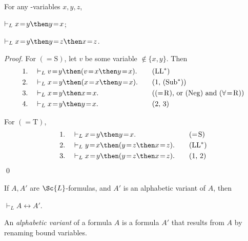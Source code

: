 \documentclass[11pt]{woarticle}
\theoremstyle{break}
\theoremstyle{nonumberplain}
\newcommand{\1}{\;\,|\;\,}
\newcommand{\T}[1]{\ensuremath{(\mathrm{ #1})}}
\newcommand{\itemT}[1]{\item[\T{#1}]}
\begin{document}
\begin{lemma}\label{symtrans}
  For any -variables $x,y,z$,
  \begin{semantics}
    \itemT{=\!S} $\vdash_L x\!=\!y \then y\!=\!x$;
    \itemT{=\!T} $\vdash_L x\!=\!y \then y\!=\!z \then x\!=\!z$.
  \end{semantics}
\end{lemma}  

\begin{proof}
  For \T{=S}, let $v$ be some variable $\not\in \{x,y\}$. Then
  \begin{alignat*}{2}
    1.\quad&\vdash_{L} v\!=\!y \then (v\!=\!x \then y\!=\!x). &\quad& \text{\T{LL^*}}\\
    2.\quad& \vdash_{L} x\!=\!y \then (x\!=\!x \then y\!=\!x). && \text{(1, \T{Sub^*})}\\
    3.\quad& \vdash_{L} x\!=\!y \then x\!=\!x. 
        && \text{(\T{=\!R}, or \T{Neg} and \T{\forall\!=\!R})}\\
    4.\quad& \vdash_{L} x\!=\!y \then y\!=\!x. && \text{(2, 3)}
  \end{alignat*}

  For \T{=T},
  \begin{alignat*}{2}
    1.\quad& \vdash_{L} x\!=\!y \then y\!=\!x. &\quad& \text{\T{=\!S}}\\
    2.\quad& \vdash_{L} y\!=\!x \then (y\!=\!z \then x\!=\!z). && \text{\T{LL^*}}\\
    3.\quad& \vdash_{L} x\!=\!y \then (y\!=\!z \then x\!=\!z). && \text{(1, 2)}
  \end{alignat*}
  \qed
\end{proof}

\begin{lemma}\label{alphasyn}
  If $A,A'$ are $\Sc{L}$-formulas, and $A'$ is an alphabetic variant of
  $A$, then
  \begin{semantics}
    \itemT{AC} $\vdash_{L} A \leftrightarrow A'$.
  \end{semantics}
\end{lemma}
An \emph{alphabetic variant} of a formula $A$ is a formula $A'$ that results from $A$ by renaming bound variables.
\end{document}
